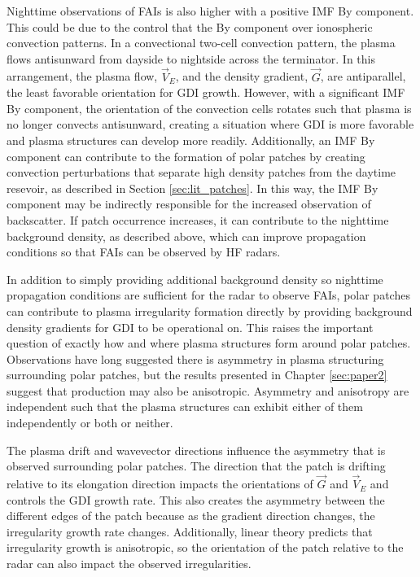 Nighttime observations of FAIs is also higher with a positive IMF By component.  This could be due to the control that the By component over ionospheric convection patterns.  In a convectional two-cell convection pattern, the plasma flows antisunward from dayside to nightside across the terminator.  In this arrangement, the plasma flow, \(\vec{V}_E\), and the density gradient, \(\vec{G}\), are antiparallel, the least favorable orientation for GDI growth.  However, with a significant IMF By component, the orientation of the convection cells rotates such that plasma is no longer convects antisunward, creating a situation where GDI is more favorable and plasma structures can develop more readily.  Additionally, an IMF By component can contribute to the formation of polar patches by creating convection perturbations that separate high density patches from the daytime resevoir, as described in Section \ref{sec:lit_patches}.  In this way, the IMF By component may be indirectly responsible for the increased observation of backscatter.  If patch occurrence increases, it can contribute to the nighttime background density, as described above, which can improve propagation conditions so that FAIs can be observed by 
HF radars.

In addition to simply providing additional background density so nighttime propagation conditions are sufficient for the radar to observe FAIs, polar patches can contribute to plasma irregularity formation directly by providing background density gradients for GDI to be operational on.  This raises the important question of exactly how and where plasma structures form around polar patches.  Observations have long suggested there is asymmetry in plasma structuring surrounding polar patches, but the results presented in Chapter \ref{sec:paper2} suggest that production may also be anisotropic.  Asymmetry and anisotropy are independent such that the plasma structures can exhibit either of them independently or both or neither.

The plasma drift and wavevector directions influence the asymmetry that is observed surrounding polar patches.  The direction that the patch is drifting relative to its elongation direction impacts the orientations of \(\vec{G}\) and \(\vec{V}_E\) and controls the GDI growth rate.  This also creates the asymmetry between the different edges of the patch because as the gradient direction changes, the irregularity growth rate changes.  Additionally, linear theory predicts that irregularity growth is anisotropic, so the orientation of the patch relative to the radar can also impact the observed irregularities.



